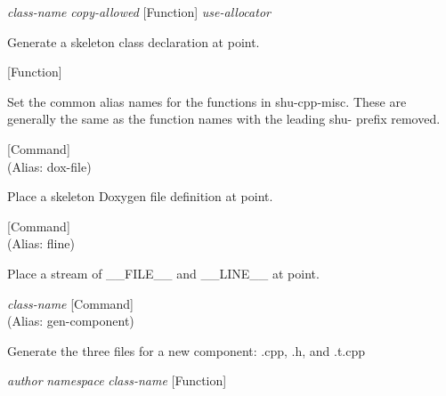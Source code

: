 \vspace{1em}
\noindent
{}
\usebox{\funcname}\emph{class-name} \emph{copy-allowed}
 \hfill [Function]
\hspace*{\wd\funcname}\emph{use-allocator}

\begin{doc-string}
Generate a skeleton class declaration at point.
\end{doc-string}

\vspace{1em}
\noindent
{}
\usebox{\funcname}
 \hfill [Function]

\begin{doc-string}
Set the common alias names for the functions in shu-cpp-misc.
These are generally the same as the function names with the leading
shu- prefix removed.
\end{doc-string}

\vspace{1em}
\noindent
{}
\usebox{\funcname}
 \hfill [Command]\\%
 (Alias: dox-file)

\begin{doc-string}
Place a skeleton Doxygen file definition at point.
\end{doc-string}

\vspace{1em}
\noindent
{}
\usebox{\funcname}
 \hfill [Command]\\%
 (Alias: fline)

\begin{doc-string}
Place a stream of \_\_FILE\_\_ and \_\_LINE\_\_ at point.
\end{doc-string}

\vspace{1em}
\noindent
{}
\usebox{\funcname}\emph{class-name}
 \hfill [Command]\\%
 (Alias: gen-component)

\begin{doc-string}
Generate the three files for a new component: .cpp, .h, and .t.cpp
\end{doc-string}

\vspace{1em}
\noindent
{}
\usebox{\funcname}\emph{author} \emph{namespace} \emph{class-name}
 \hfill [Function]

